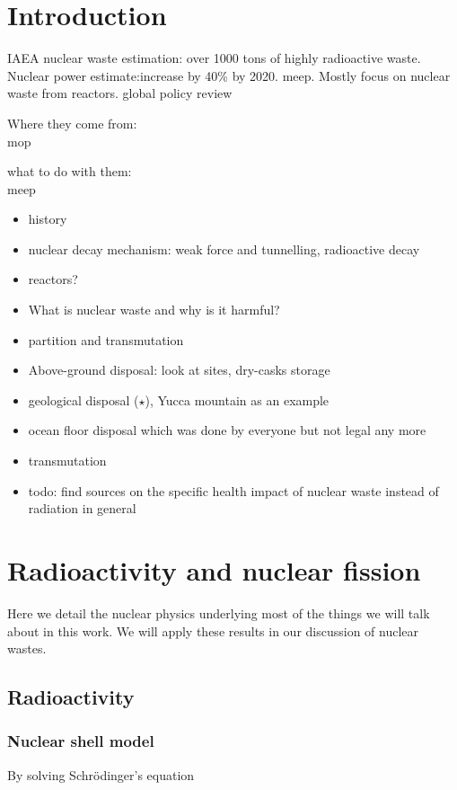 \documentclass[preprint,aip,cha]{revtex4-1}
\begin{document}
\section{Introduction}
IAEA nuclear waste estimation: over 1000 tons of highly radioactive waste.\cite{iaea08}
Nuclear power estimate:increase by 40\% by 2020. \cite{iaea12}
meep. Mostly focus on nuclear waste from reactors.
global policy review \cite{r12} 

Where they come from:\\
mop

what to do with them:\\
meep

\begin{itemize}
    \item history
    \item nuclear decay mechanism: weak force and tunnelling, radioactive decay
    \item reactors?
    \item What is nuclear waste and why is it harmful?
    \item partition and transmutation
    \item Above-ground disposal: look at sites, dry-casks storage
    \item geological disposal ($\star$), Yucca mountain as an example
    \item ocean floor disposal which was done by everyone but not legal any more
    \item transmutation
    \item todo: find sources on the specific health impact of nuclear waste instead of radiation
        in general
\end{itemize}

\section{Radioactivity and nuclear fission}
    Here we detail the nuclear physics underlying most of the things we will talk about
    in this work. We will apply these results in our discussion of nuclear wastes.
    \subsection{Radioactivity}
        \subsubsection{Nuclear shell model}
        By solving Schr\"{o}dinger's equation\cite{k88}
\end{document}
